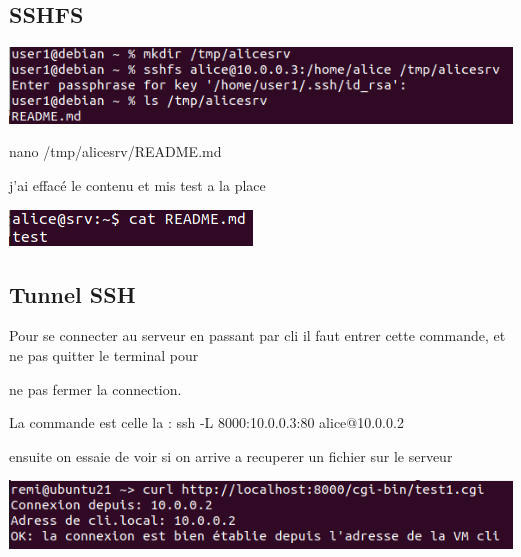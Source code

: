 \documentclass{article}
\begin{document}
 \subsection*{\normalsize{SSHFS} } 
 
 \begin{center}
        \includegraphics[scale=0.5]{Images/sshfs.png}
 \end{center}
 
 nano /tmp/alicesrv/README.md \par
 j’ai effacé le contenu et mis test a la place
 
 
  \begin{center}
        \includegraphics[scale=0.5]{Images/sshfsresult.png}
 \end{center}
 
 
 
 \subsection{\large{Tunnel SSH}}
 
 Pour se connecter au serveur en passant par cli il faut entrer cette commande, et ne pas quitter le terminal pour \par ne pas fermer la connection. \par
 
 La commande est celle la : ssh -L 8000:10.0.0.3:80 alice@10.0.0.2
 
 ensuite on essaie de voir si on arrive a recuperer un fichier sur le serveur
 
 \begin{center}
        \includegraphics[scale=0.5]{Images/curl.png}
 \end{center}
 
\end{document}
